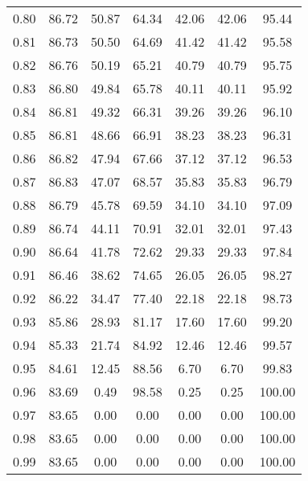 \begin{tabular}{|c|c|c|c|c|c|c|}
      0.80 &     86.72 &     50.87 &      64.34 &   42.06 &      42.06 &         95.44 \\
      0.81 &     86.73 &     50.50 &      64.69 &   41.42 &      41.42 &         95.58 \\
      0.82 &     86.76 &     50.19 &      65.21 &   40.79 &      40.79 &         95.75 \\
      0.83 &     86.80 &     49.84 &      65.78 &   40.11 &      40.11 &         95.92 \\
      0.84 &     86.81 &     49.32 &      66.31 &   39.26 &      39.26 &         96.10 \\
      0.85 &     86.81 &     48.66 &      66.91 &   38.23 &      38.23 &         96.31 \\
      0.86 &     86.82 &     47.94 &      67.66 &   37.12 &      37.12 &         96.53 \\
      0.87 &     86.83 &     47.07 &      68.57 &   35.83 &      35.83 &         96.79 \\
      0.88 &     86.79 &     45.78 &      69.59 &   34.10 &      34.10 &         97.09 \\
      0.89 &     86.74 &     44.11 &      70.91 &   32.01 &      32.01 &         97.43 \\
      0.90 &     86.64 &     41.78 &      72.62 &   29.33 &      29.33 &         97.84 \\
      0.91 &     86.46 &     38.62 &      74.65 &   26.05 &      26.05 &         98.27 \\
      0.92 &     86.22 &     34.47 &      77.40 &   22.18 &      22.18 &         98.73 \\
      0.93 &     85.86 &     28.93 &      81.17 &   17.60 &      17.60 &         99.20 \\
      0.94 &     85.33 &     21.74 &      84.92 &   12.46 &      12.46 &         99.57 \\
      0.95 &     84.61 &     12.45 &      88.56 &    6.70 &       6.70 &         99.83 \\
      0.96 &     83.69 &      0.49 &      98.58 &    0.25 &       0.25 &        100.00 \\
      0.97 &     83.65 &      0.00 &       0.00 &    0.00 &       0.00 &        100.00 \\
      0.98 &     83.65 &      0.00 &       0.00 &    0.00 &       0.00 &        100.00 \\
      0.99 &     83.65 &      0.00 &       0.00 &    0.00 &       0.00 &        100.00 \\
\bottomrule
\end{tabular}
